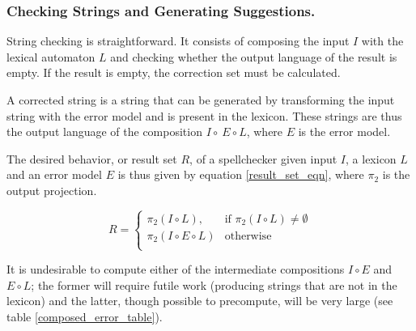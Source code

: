 \documentclass[draft]{llncs}
\begin{document}
\subsubsection{Checking Strings and Generating Suggestions.}

String checking is straight\-forward. It consists of composing the
input $I$ with the lexical automaton $L$ and checking whether the
output language of the result is empty. If the result is empty, the
correction set must be calculated.


A corrected string is a string that can be generated by transforming the
input string with the error model and is present in the lexicon.
These strings are thus the output language of the composition
$I \circ \ E \circ L$, where $E$ is the error model.

The desired behavior, or result set $R$, of a spellchecker given input $I$, a
lexicon $L$ and an error model $E$ is thus given by equation \ref{result_set_eqn},
where $\pi_2$ is the output projection.

\begin{equation}
  \label{result_set_eqn}
  R = \begin{cases}
    \pi_2(I \circ L), & \mbox{if } \pi_2(I \circ L) \neq \emptyset \\
    \pi_2(I \circ E \circ L) & \mbox{otherwise}\\
  \end{cases}
\end{equation}

It is undesirable to compute either of the intermediate compositions
$I \circ E$ and $E \circ L$; the former will require futile work (producing
strings that are not in the lexicon) and the latter, though possible to
precompute, will be very large (see table \ref{composed_error_table}).
\end{document}
